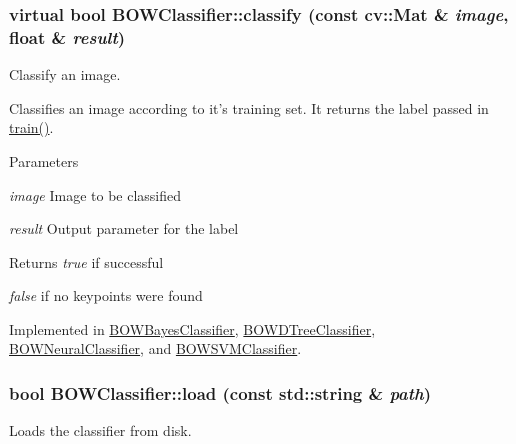 \hypertarget{classBOWClassifier_a63bff22f5005e1b79d9c4cd5e7a57748}{
\subsubsection[{classify}]{\setlength{\rightskip}{0pt plus 5cm}virtual bool BOWClassifier::classify (const cv::Mat \& {\em image}, \/  float \& {\em result})}}
\label{classBOWClassifier_a63bff22f5005e1b79d9c4cd5e7a57748}


Classify an image. 

Classifies an image according to it's training set. It returns the label passed in \hyperlink{classBOWClassifier_a8a00f5cadf166f361a411d5a4e67b4d6}{train()}.


\begin{DoxyParams}{Parameters}
\item[{\em image}]Image to be classified \item[{\em result}]Output parameter for the label \end{DoxyParams}
\begin{DoxyReturn}{Returns}
{\itshape true\/} if successful\par
 {\itshape false\/} if no keypoints were found 
\end{DoxyReturn}


Implemented in \hyperlink{classBOWBayesClassifier_a360c377b335ad194f73c1659795afef5}{BOWBayesClassifier}, \hyperlink{classBOWDTreeClassifier_acbdf32fc2b2463f099efdf4000f3e2c1}{BOWDTreeClassifier}, \hyperlink{classBOWNeuralClassifier_accce7f4efd81373d87b9a6cef7802e1b}{BOWNeuralClassifier}, and \hyperlink{classBOWSVMClassifier_afe93005b018993deb266193ff942554a}{BOWSVMClassifier}.

\hypertarget{classBOWClassifier_adcf5bbbd1c4177853601fa3f984ae491}{
\subsubsection[{load}]{\setlength{\rightskip}{0pt plus 5cm}bool BOWClassifier::load (const std::string \& {\em path})}}
\label{classBOWClassifier_adcf5bbbd1c4177853601fa3f984ae491}


Loads the classifier from disk. 

